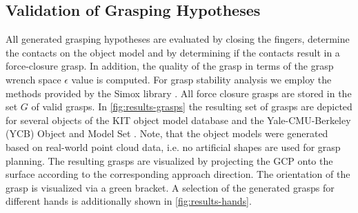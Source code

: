 \subsection{Validation of Grasping Hypotheses}

All generated grasping hypotheses are evaluated by closing the fingers, determine the contacts on the object model and by determining if the contacts result in a force-closure grasp. In addition, the quality of the grasp in terms of the grasp wrench space $\epsilon$ value is computed. For grasp stability analysis we employ the methods provided by the Simox library \cite{Vahrenkamp12b}.
All force closure grasps are stored in the set $G$ of valid grasps.
In \autoref{fig:results-grasps} the resulting set of grasps are depicted for several objects of the KIT object model database \cite{Kasper12} and the Yale-CMU-Berkeley (YCB) Object and Model Set \cite{Calli2015}. Note, that the object models were generated based on real-world point cloud data, i.e. no artificial shapes are used for grasp planning. 
The resulting grasps are visualized by projecting the GCP onto the surface according to the corresponding approach direction. The orientation of the grasp is visualized via a green bracket.
A selection of the generated grasps for different hands is additionally shown in \autoref{fig:results-hands}.
